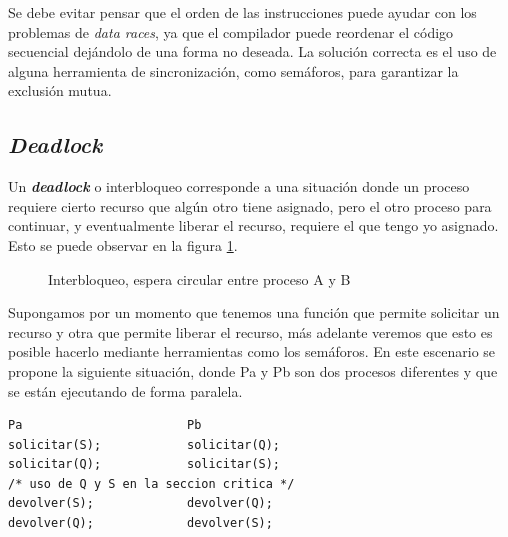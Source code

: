 Se debe evitar pensar que el orden de las instrucciones puede ayudar con los
problemas de \textit{data races}, ya que el compilador puede reordenar el código
secuencial dejándolo de una forma no deseada. La solución correcta es el uso de
alguna herramienta de sincronización, como semáforos, para garantizar la
exclusión mutua.

\subsection{\textit{Deadlock}}
Un \textbf{\textit{deadlock}} o interbloqueo corresponde a una situación donde
un proceso requiere cierto recurso que algún otro tiene asignado, pero el otro
proceso para continuar, y eventualmente liberar el recurso, requiere el que
tengo yo asignado. Esto se puede observar en la figura \ref{fig:interbloqueo}.

\begin{figure}[htbp]
	\centering
	\caption{Interbloqueo, espera circular entre proceso A y B}
	\label{fig:interbloqueo}
\end{figure}

Supongamos por un momento que tenemos una función que permite solicitar un
recurso y otra que permite liberar el recurso, más adelante veremos que esto es
posible hacerlo mediante herramientas como los semáforos. En este escenario se
propone la siguiente situación, donde Pa y Pb son dos procesos diferentes y que
se están ejecutando de forma paralela.

\begin{lstlisting}
Pa                       Pb
solicitar(S);            solicitar(Q);
solicitar(Q);            solicitar(S);
/* uso de Q y S en la seccion critica */
devolver(S);             devolver(Q);
devolver(Q);             devolver(S);
\end{lstlisting}


